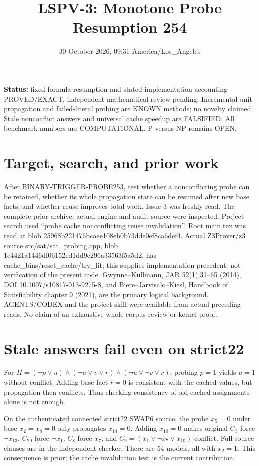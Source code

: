 \documentclass[11pt]{article}
\title{LSPV-3: Monotone Probe Resumption 254}
\date{30 October 2026, 09:31 America/Los\_Angeles}
\begin{document}
\maketitle
\noindent\textbf{Status:} fixed-formula resumption and stated implementation accounting PROVED/EXACT, independent mathematical review pending. Incremental unit propagation and failed-literal probing are KNOWN methods; no novelty claimed. Stale nonconflict answers and universal cache speedup are FALSIFIED. All benchmark numbers are COMPUTATIONAL. P versus NP remains OPEN.

\section{Target, search, and prior work}
After BINARY-TRIGGER-PROBE253, test whether a nonconflicting probe can be retained, whether its whole propagation state can be resumed after new base facts, and whether reuse improves total work. Issue 3 was freshly read. The complete prior archive, actual engine and audit source were inspected. Project search used ``probe cache nonconflicting reuse invalidation''. Root main.tex was read at blob 25968b221476bcaee108eb0b73dde0ef8ca6def4. Actual Z3Prover/z3 source src/sat/sat\_probing.cpp, blob 1e4421a1446df06152ed1dd9e296a33563f5a5d2, has cache\_bins/reset\_cache/try\_lit; this supplies implementation precedent, not verification of the present code. Gwynne--Kullmann, JAR 52(1),31--65 (2014), DOI 10.1007/s10817-013-9275-8, and Biere--Jarvisalo--Kiesl, Handbook of Satisfiability chapter 9 (2021), are the primary logical background. AGENTS/CODEX and the project skill were available from actual preceding reads. No claim of an exhaustive whole-corpus review or kernel proof.

\section{Stale answers fail even on strict22}
For $H=(\neg p\vee u)\land(\neg u\vee v\vee r)\land(\neg u\vee\neg v\vee r)$, probing $p=1$ yields $u=1$ without conflict. Adding base fact $r=0$ is consistent with the cached values, but propagation then conflicts. Thus checking consistency of old cached assignments alone is not enough.

On the authenticated connected strict22 SWAP6 source, the probe $x_5=0$ under base $x_2=x_8=0$ only propagates $x_{14}=0$. Adding $x_{10}=0$ makes original $C_3$ force $\neg x_{13}$, $C_{20}$ force $\neg x_1$, $C_8$ force $x_7$, and $C_9=(x_1\vee\neg x_7\vee x_{10})$ conflict. Full source clauses are in the independent checker. There are 54 models, all with $x_2=1$. This consequence is prior; the cache invalidation test is the current contribution.
\end{document}
